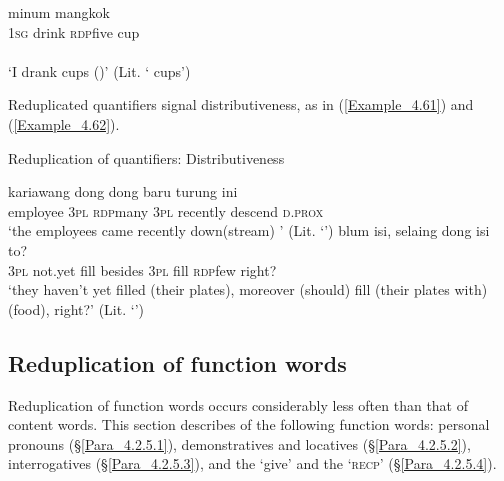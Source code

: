 {\ea
\label{Example_4.60}
 {minum} {} {mangkok} \\
\textsc{1sg} drink \textsc{rdp}{\Tilde}five cup\\
\\
 ‘I drank  cups ()’ (Lit. ‘ cups’) \textstyleExampleSource{[081025-009a-Cv.0070]} \\
\z


Reduplicated quantifiers signal distributiveness, as in (\ref{Example_4.61}) and (\ref{Example_4.62}).


\begin{styleExampleTitle}
Reduplication of quantifiers: Distributiveness
\end{styleExampleTitle}

\ea
\label{Example_4.61}
\gll {\ldots} {kariawang} {dong} {} {dong} {baru} {turung} {ini}\\ %
 { }  employee  \textsc{3pl}  \textsc{rdp}{\Tilde}many  \textsc{3pl}  recently  descend  \textsc{d.prox}\\
 ‘the employees came recently down(stream) ’ (Lit. ‘’) \textstyleExampleSource{[080922-001a-CvPh.0812]}
\z
\ea
\label{Example_4.62}
 {blum} {isi}, {selaing} {dong} {isi} {} {to?}\\ %
 \textsc{3pl}  not.yet  fill  besides  \textsc{3pl}  fill  \textsc{rdp}{\Tilde}few  right?\\
 ‘they haven’t yet filled (their plates), moreover  (should) fill (their plates with)  (food), right?’ (Lit. ‘’) \textstyleExampleSource{[081025-009a-Cv.0081]}
\z


\subsection{Reduplication of function words}
\label{Para_4.2.5}
Reduplication of function words occurs considerably less often than that of content words. This section describes  of the following function words: personal pronouns (§\ref{Para_4.2.5.1}), demonstratives and locatives (§\ref{Para_4.2.5.2}), interrogatives (§\ref{Para_4.2.5.3}), and the    ‘give’ and the   ‘\textsc{recp}’ (§\ref{Para_4.2.5.4}).


}
